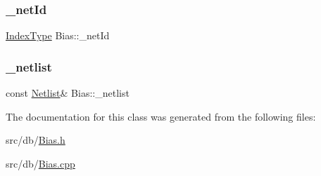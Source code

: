 \mbox{\label{classBias_a9fac526ba276c7593241f7ba439c0f31}} 
\subsubsection{\texorpdfstring{\+\_\+net\+Id}{\_netId}}
{\footnotesize\ttfamily \hyperlink{type_8h_a581e8093e28e7362f2b6937296190676}{Index\+Type} Bias\+::\+\_\+net\+Id\hspace{0.3cm}{\ttfamily [private]}}

\mbox{\label{classBias_a80d38b13e72f5586c72013a91f6914a6}} 
\subsubsection{\texorpdfstring{\+\_\+netlist}{\_netlist}}
{\footnotesize\ttfamily const \hyperlink{classNetlist}{Netlist}\& Bias\+::\+\_\+netlist\hspace{0.3cm}{\ttfamily [private]}}



The documentation for this class was generated from the following files\+:\begin{DoxyCompactItemize}
\item 
src/db/\hyperlink{Bias_8h}{Bias.\+h}\item 
src/db/\hyperlink{Bias_8cpp}{Bias.\+cpp}\end{DoxyCompactItemize}
